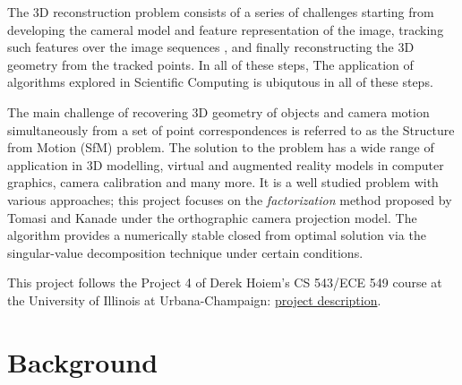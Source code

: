 The 3D reconstruction problem consists of a series of challenges starting from developing the
cameral model and feature representation of the image,
tracking such features over the image sequences , and finally
reconstructing the 3D geometry from the tracked points. In all of these steps,  The application of algorithms explored in
Scientific Computing is ubiqutous in all of these steps. 

The main challenge of recovering 3D geometry of objects and camera motion simultaneously from a set of point
correspondences is referred to as the Structure from Motion (SfM) problem. The solution to the problem has a
wide range of application in 3D modelling, virtual and augmented
reality models in computer graphics, camera calibration and many
more. It is a well studied problem with various approaches; this project focuses on the \emph{factorization} method proposed by Tomasi and Kanade
\cite{Tomasi} under the orthographic camera projection model. The
algorithm provides a numerically stable closed from optimal solution
via the singular-value decomposition technique under certain
conditions. \cite[p. 435]{AZ}

This project follows the Project 4 of Derek Hoiem's CS 543/ECE 549
course at the University of Illinois at Urbana-Champaign:
\href{http://www.cs.illinois.edu/class/sp11/cs543/hw/hw4.pdf}{project
  description}. 

\section{Background}

